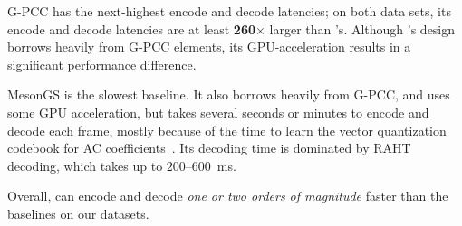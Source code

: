 G-PCC has the next-highest encode and decode latencies; on both data sets, its encode and decode latencies are at least \textbf{260}$\times$ larger than \gsnfs{}'s.
%
Although \gsnfs{}'s design borrows heavily from G-PCC elements, its GPU-acceleration results in a significant performance difference.

MesonGS is the slowest baseline.
%
It also borrows heavily from G-PCC, and uses some GPU acceleration, but takes several seconds or minutes to encode and decode each \gs frame, mostly because of the time to learn the vector quantization codebook for AC coefficients~\cite{mesongs}.
%
Its decoding time is dominated by RAHT decoding, which takes up to $200$--$600$~ms. 

Overall, \gsnfs{} can encode and decode \textit{one or two orders of magnitude} faster than the baselines on our datasets.



